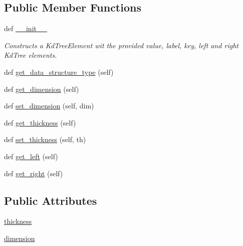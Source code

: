 \subsection*{Public Member Functions}
\begin{DoxyCompactItemize}
\item 
def \hyperlink{classbridges_1_1kd__tree__element_1_1_k_d_tree_element_a46ef0064cc8185acdd02546d234dc97a}{\+\_\+\+\_\+init\+\_\+\+\_\+}
\begin{DoxyCompactList}\small\item\em Constructs a Kd\+Tree\+Element wit the provided value, label, key, left and right Kd\+Tree elements. \end{DoxyCompactList}\item 
def \hyperlink{classbridges_1_1kd__tree__element_1_1_k_d_tree_element_ac76e921a6607344f18ccd45a07873f1b}{get\+\_\+data\+\_\+structure\+\_\+type} (self)
\item 
def \hyperlink{classbridges_1_1kd__tree__element_1_1_k_d_tree_element_a4be42f046237f2f7e54aa4dc62b54f44}{get\+\_\+dimension} (self)
\item 
def \hyperlink{classbridges_1_1kd__tree__element_1_1_k_d_tree_element_a2a4b2e02aa5dbd3dcac62231888240ba}{set\+\_\+dimension} (self, dim)
\item 
def \hyperlink{classbridges_1_1kd__tree__element_1_1_k_d_tree_element_ab7f10ab9e9d16602103754e433a8bcb8}{get\+\_\+thickness} (self)
\item 
def \hyperlink{classbridges_1_1kd__tree__element_1_1_k_d_tree_element_a4e19fc719121edc0748b65b8a1d8da48}{set\+\_\+thickness} (self, th)
\item 
def \hyperlink{classbridges_1_1kd__tree__element_1_1_k_d_tree_element_ae4aa1b2997d4c19de95bfbcfbea14729}{get\+\_\+left} (self)
\item 
def \hyperlink{classbridges_1_1kd__tree__element_1_1_k_d_tree_element_a531d4c216e872a252cf8004930777a2c}{get\+\_\+right} (self)
\end{DoxyCompactItemize}
\subsection*{Public Attributes}
\begin{DoxyCompactItemize}
\item 
\hyperlink{classbridges_1_1kd__tree__element_1_1_k_d_tree_element_a3eb7cd079ee2f28341c5f505b5f9551a}{thickness}
\item 
\hyperlink{classbridges_1_1kd__tree__element_1_1_k_d_tree_element_a893137cbfc8bccee32c9d75a513ed16c}{dimension}
\end{DoxyCompactItemize}
